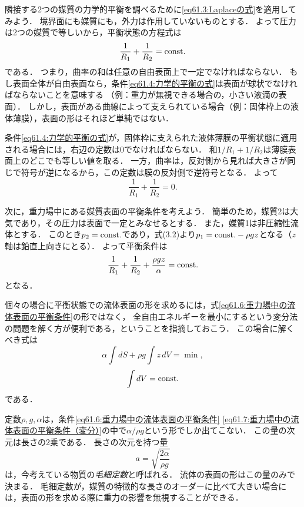 隣接する2つの媒質の力学的平衡を調べるために\eqref{eq61.3:Laplaceの式}を適用してみよう．
境界面にも媒質にも，外力は作用していないものとする．
よって圧力は2つの媒質で等しいから，平衡状態の方程式は
\begin{equation}\label{eq61.4:力学的平衡の式}
    \frac{1}{R_1} + \frac{1}{R_2} = \mathrm{const.}
\end{equation}
である．
つまり，曲率の和は任意の自由表面上で一定でなければならない．
もし表面全体が自由表面なら，条件\eqref{eq61.4:力学的平衡の式}は表面が球状でなければならないことを意味する
（例：重力が無視できる場合の，小さい液滴の表面）．
しかし，表面がある曲線によって支えられている場合（例：固体枠上の液体薄膜），表面の形はそれほど単純ではない．



条件\eqref{eq61.4:力学的平衡の式}が，固体枠に支えられた液体薄膜の平衡状態に適用される場合には，右辺の定数は0でなければならない．
和$1/R_1+1/R_2$は薄膜表面上のどこでも等しい値を取る．
一方，曲率は，反対側から見れば大きさが同じで符号が逆になるから，この定数は膜の反対側で逆符号となる．
よって
\begin{equation}
    \frac{1}{R_1} + \frac{1}{R_2} = 0 .
\end{equation}


次に，重力場中にある媒質表面の平衡条件を考えよう．
簡単のため，媒質2は大気であり，その圧力は表面で一定とみなせるとする．
また，媒質1は非圧縮性流体とする．
このとき$p_2=\mathrm{const.}$であり，式(3.2)より$p_1 = \mathrm{const.} - \rho gz$となる（$z$軸は鉛直上向きにとる）．
よって平衡条件は
\begin{equation}\label{eq61.6:重力場中の流体表面の平衡条件}
    \frac{1}{R_1} + \frac{1}{R_2} + \frac{\rho gz}{\alpha} = \mathrm{const.}
\end{equation}
となる．


個々の場合に平衡状態での流体表面の形を求めるには，式\eqref{eq61.6:重力場中の流体表面の平衡条件}の形ではなく，
全自由エネルギーを最小にするという変分法の問題を解く方が便利である，ということを指摘しておこう．
この場合に解くべき式は
\begin{equation}\label{eq61.7:重力場中の流体表面の平衡条件（変分）}
    \alpha \int dS + \rho g \int z \, dV = \min,
\end{equation}
\begin{equation}
    \int dV = \mathrm{const.}
\end{equation}
である．



定数$\rho, g, \alpha$は，条件\eqref{eq61.6:重力場中の流体表面の平衡条件}
\eqref{eq61.7:重力場中の流体表面の平衡条件（変分）}の中で$\alpha/\rho g$という形でしか出てこない．
この量の次元は長さの2乗である．
長さの次元を持つ量
\begin{equation}
    a = \sqrt{ \frac{2\alpha}{\rho g} }
\end{equation}
は，今考えている物質の\emph{毛細定数}と呼ばれる．
流体の表面の形はこの量のみで決まる．
毛細定数が，媒質の特徴的な長さのオーダーに比べて大きい場合には，表面の形を求める際に重力の影響を無視することができる．



